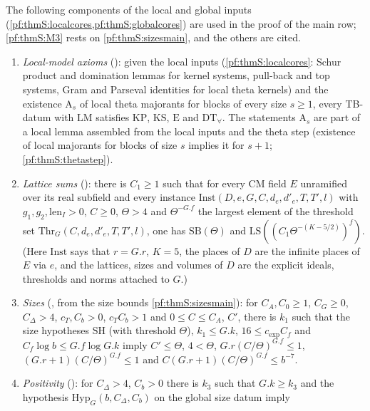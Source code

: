 The following components of the local and global inputs (\cref{pf:thmS:localcores,pf:thmS:globalcores}) are used in
the proof of the main row; \ref{pf:thmS:M3} rests on \cref{pf:thmS:sizesmain}, and the others are cited.
\begin{enumerate}[label=(M\arabic*)]
\item\label{pf:thmS:M1} \emph{Local-model axioms} ():
given the local inputs (\cref{pf:thmS:localcores}: Schur product and domination lemmas for kernel systems,
pull-back and top systems, Gram and Parseval identities for local theta kernels) and the existence $\mathrm{A}_s$ of local theta majorants for blocks of every size $s\ge1$, every
TB-datum with $\mathrm{LM}$ satisfies $\mathrm{KP}$, $\mathrm{KS}$, $\mathrm{E}$ and
$\mathrm{DT}_{\forall}$. The statements $\mathrm{A}_s$ are part of a local lemma assembled from the local inputs and the theta step (existence of local majorants for blocks of size
$s$ implies it for $s+1$; \cref{pf:thmS:thetastep}).
\item\label{pf:thmS:M2} \emph{Lattice sums} (): there is
$C_1\ge1$ such that for every CM field $E$ unramified over its real subfield and every instance
$\mathrm{Inst}(D,e,G,C,d_e,d'_e,T,T',l)$ with $g_1,g_2,\mathrm{len}_I>0$, $C\ge0$, $\Theta>4$ and $\Theta^{-G.f}$ the largest
element of the threshold set $\mathrm{Thr}_G(C,d_e,d'_e,T,T',l)$, one has $\mathrm{SB}(\Theta)$ and
$\mathrm{LS}((C_1\Theta^{-(K-5/2)})^f)$. (Here $\mathrm{Inst}$ says that $r=G.r$, $K=5$, the places of $D$ are
the infinite places of $E$ via $e$, and the lattices, sizes and volumes of $D$ are the explicit ideals, thresholds and
norms attached to $G$.)
\item\label{pf:thmS:M3} \emph{Sizes} (, from
the size bounds \cref{pf:thmS:sizesmain}): for $C_A,C_0\ge1$, $C_G\ge0$, $C_\Delta>4$, $c_T,C_b>0$,
$c_TC_b>1$ and $0\le C\le C_A$, $C'$, there is $k_1$ such that the size hypotheses $\mathrm{SH}$ (with threshold
$\Theta$), $k_1\le G.k$, $16\le c_{\exp}C_f$ and $C_f\log b\le G.f\log G.k$ imply $C'\le\Theta$, $4<\Theta$,
$G.r(C/\Theta)^{G.f}\le1$, $(G.r+1)(C/\Theta)^{G.f}\le1$ and $C(G.r+1)(C/\Theta)^{G.f}\le b^{-7}$.
\item\label{pf:thmS:M4} \emph{Positivity} (): for
$C_\Delta>4$, $C_b>0$ there is $k_3$ such that $G.k\ge k_3$ and the hypothesis $\mathrm{Hyp}_G(b,C_\Delta,C_b)$ on the global size datum imply

\end{enumerate}
